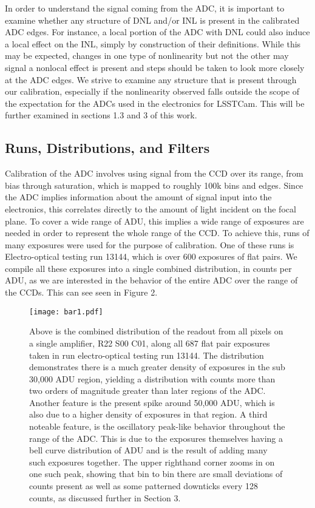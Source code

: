 \documentclass[11pt, letterpaper]{article}
\begin{document}
In order to understand the signal coming from the ADC, it is important to examine whether any structure of DNL and/or INL is present in the calibrated ADC edges.
For instance, a local portion of the ADC with DNL could also induce a local effect on the INL, simply by construction of their definitions.
While this may be expected, changes in one type of nonlinearity but not the other may signal a nonlocal effect is present and steps should be taken to look more closely at the ADC edges. 
We strive to examine any structure that is present through our calibration, especially if the nonlinearity observed falls outside the scope of the expectation for the ADCs used in the electronics for LSSTCam. 
This will be further examined in sections 1.3 and 3 of this work.


\subsection{Runs, Distributions, and Filters}
\indent

Calibration of the ADC involves using signal from the CCD over its range, from bias through saturation, which is mapped to roughly 100k bins and edges. 
Since the ADC implies information about the amount of signal input into the electronics, this correlates directly to the amount of light incident on the focal plane.
To cover a wide range of ADU, this implies a wide range of exposures are needed in order to represent the whole range of the CCD.
To achieve this, runs of many exposures were used for the purpose of calibration. 
One of these runs is Electro-optical testing run 13144, which is over 600 exposures of flat pairs. 
We compile all these exposures into a single combined distribution, in counts per ADU, as we are interested in the behavior of the entire ADC over the range of the CCDs. 
This can see seen in Figure 2. 

\begin{figure}
	\texttt{[image: bar1.pdf]}
	\caption{Above is the combined distribution of the readout from all pixels on a single amplifier, R22 S00 C01, along all 687 flat pair exposures taken in run electro-optical testing run 13144. The distribution demonstrates there is a much greater density of exposures in the sub 30,000 ADU region, yielding a distribution with counts more than two orders of magnitude greater than later regions of the ADC. Another feature is the present spike around 50,000 ADU, which is also due to a higher density of exposures in that region. A third noteable feature, is the oscillatory peak-like behavior throughout the range of the ADC. This is due to the exposures themselves having a bell curve distribution of ADU and is the result of adding many such exposures together. The upper righthand corner zooms in on one such peak, showing that bin to bin there are small deviations of counts present as well as some patterned downticks every 128 counts, as discussed further in Section 3.}
\end{figure}
\indent 
\end{document}
